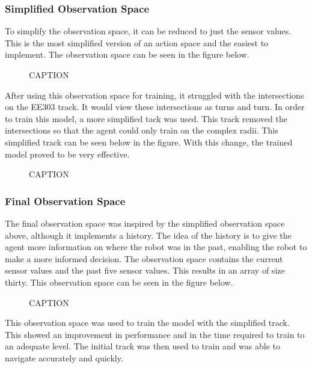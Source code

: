 \documentclass[a4paper,11pt]{article}
\begin{document}
\subsubsection{Simplified Observation Space}

To simplify the observation space, it can be reduced to just the sensor values. This is the most simplified version of an action space and the easiest to implement. The observation space can be seen in the figure below. 

\begin{figure}[H]
\label{fig:}
\centering
\caption{CAPTION}
\end{figure}
 
After using this observation space for training, it struggled with the intersections on the EE303 track. It would view these intersections as turns and turn. In order to train this model, a more simplified tack was used. This track removed the intersections so that the agent could only train on the complex radii. This simplified track can be seen below in the figure. With this change, the trained model proved to be very effective.

\begin{figure}[H]
\label{fig:}
\centering
\caption{CAPTION}
\end{figure}

 
\subsubsection{Final Observation Space}

The final observation space was inspired by the simplified observation space above, although it implements a history. The idea of the history is to give the agent more information on where the robot was in the past, enabling the robot to make a more informed decision. The observation space contains the current sensor values and the past five sensor values. This results in an array of size thirty. This observation space can be seen in the figure below.

\begin{figure}[H]
\label{fig:}
\centering
\caption{CAPTION}
\end{figure}

 
This observation space was used to train the model with the simplified track. This showed an improvement in performance and in the time required to train to an adequate level. The initial track was then used to train and was able to navigate accurately and quickly.
 
\end{document}
